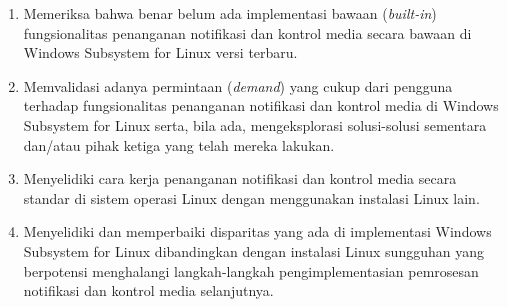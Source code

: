 \begin{enumerate}
    \item Memeriksa bahwa benar belum ada implementasi bawaan (\textit{built-in}) fungsionalitas penanganan notifikasi dan kontrol media secara bawaan di Windows Subsystem for Linux versi terbaru.

    \item Memvalidasi adanya permintaan (\textit{demand}) yang cukup dari pengguna terhadap fungsionalitas penanganan notifikasi dan kontrol media di Windows Subsystem for Linux serta, bila ada, mengeksplorasi solusi-solusi sementara dan/atau pihak ketiga yang telah mereka lakukan.


    \item Menyelidiki cara kerja penanganan notifikasi dan kontrol media secara standar di sistem operasi Linux dengan menggunakan instalasi Linux lain.
    

    \item Menyelidiki dan memperbaiki disparitas yang ada di implementasi Windows Subsystem for Linux dibandingkan dengan instalasi Linux sungguhan yang berpotensi menghalangi langkah-langkah pengimplementasian pemrosesan notifikasi dan kontrol media selanjutnya.





\end{enumerate}
